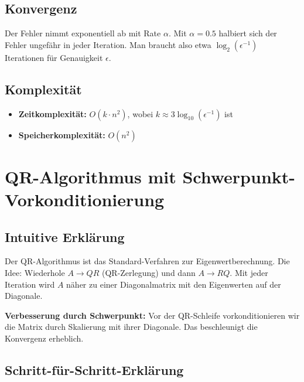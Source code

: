 \documentclass[a4paper,12pt]{article}
\begin{document}
\subsection{Konvergenz}

Der Fehler nimmt exponentiell ab mit Rate $\alpha$. Mit $\alpha = 0.5$ halbiert sich der Fehler ungefähr in jeder Iteration. Man braucht also etwa $\log_2(\epsilon^{-1})$ Iterationen für Genauigkeit $\epsilon$.

\subsection{Komplexität}

\begin{itemize}
\item \textbf{Zeitkomplexität:} $O(k \cdot n^2)$, wobei $k \approx 3 \log_{10}(\epsilon^{-1})$ ist
\item \textbf{Speicherkomplexität:} $O(n^2)$
\end{itemize}


\section{QR-Algorithmus mit Schwerpunkt-Vorkonditionierung}

\subsection{Intuitive Erklärung}

Der QR-Algorithmus ist das Standard-Verfahren zur Eigenwertberechnung. Die Idee: Wiederhole $A \to Q R$ (QR-Zerlegung) und dann $A \to R Q$. Mit jeder Iteration wird $A$ näher zu einer Diagonalmatrix mit den Eigenwerten auf der Diagonale.

\textbf{Verbesserung durch Schwerpunkt:} Vor der QR-Schleife vorkonditionieren wir die Matrix durch Skalierung mit ihrer Diagonale. Das beschleunigt die Konvergenz erheblich.

\subsection{Schritt-für-Schritt-Erklärung}
\end{document}
